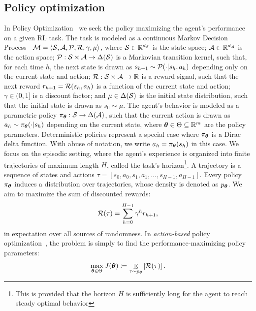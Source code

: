 \documentclass{article}
\begin{document}
\subsection{Policy optimization}
In Policy Optimization~\citep{deisenroth2013survey} we seek the policy maximizing the agent's performance on a given RL task. The task is modeled as a continuous Markov Decision Process~\citep[MDP,][]{puterman2014markov} $\mathcal{M} = \langle\mathcal{S},\mathcal{A},\mathcal{P},\mathcal{R},\gamma,\mu\rangle$, where $\mathcal{S}\in\mathbb{R}^{d_{\mathcal{S}}}$ is the state space; $\mathcal{A}\in\mathbb{R}^{d_{\mathcal{A}}}$ is the action space; $\mathcal{P}:\mathcal{S}\times\mathcal{A}\to\Delta(\mathcal{S})$ is a Markovian transition kernel, such that, for each time $h$, the next state is drawn as $s_{h+1}\sim\mathcal{P}(\cdot|s_h,a_h)$ depending only on the current state and action; $\mathcal{R}:\mathcal{S}\times\mathcal{A}\to\mathbb{R}$ is a reward signal, such that the next reward $r_{h+1} = \mathcal{R}(s_h,a_h)$ is a function of the current state and action; $\gamma\in(0,1]$ is a discount factor; and $\mu\in\Delta(\mathcal{S})$ is the initial state distribution, such that the initial state is drawn as $s_0\sim\mu$. The agent's behavior is modeled as a parametric policy $\pi_{\boldsymbol{\theta}}:\mathcal{S}\to\Delta(\mathcal{A})$, such that the current action is drawn as $a_h\sim\pi_{\boldsymbol{\theta}}(\cdot|s_h)$ depending on the current state, where $\boldsymbol{\theta}\in\Theta\subseteq\mathbb{R}^m$ are the policy parameters. Deterministic policies represent a special case where $\pi_{\boldsymbol{\theta}}$ is a Dirac delta function. With abuse of notation, we write $a_h=\pi_{\boldsymbol{\theta}}(s_h)$ in this case. We focus on the episodic setting, where the agent's experience is organized into finite trajectories of maximum length $H$, called the task's horizon\footnote{This is \wlg provided that the horizon $H$ is sufficiently long for the agent to reach steady optimal behavior}. A trajectory is a sequence of states and actions $\tau=[s_0,a_0,s_1,a_1,\dots,s_{H-1},a_{H-1}]$. Every policy $\pi_{\boldsymbol{\theta}}$ induces a distribution over trajectories, whose density is denoted as $p_{\boldsymbol{\theta}}$. We aim to maximize the sum of discounted rewards:
\begin{align}\label{eq:Rtau}
	\mathcal{R}(\tau) = \sum_{h=0}^{H-1}\gamma^hr_{h+1},
\end{align}
in expectation over all sources of randomness.
In \textit{action-based} policy optimization~\citep{peters2008reinforcement}, the problem is simply to find the performance-maximizing policy parameters:
\begin{align}\label{eq:Jtheta}
	\max_{\boldsymbol{\theta}\in\Theta} J(\boldsymbol{\theta}) \coloneqq \mathop{\mathbb{E}}_{\tau\sim p_{\boldsymbol{\theta}}}\left[\mathcal{R}(\tau)\right].
\end{align}
\end{document}
